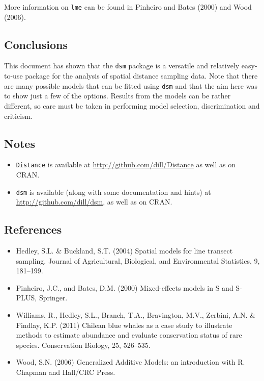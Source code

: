 \documentclass[]{article}
\begin{document}
More information on \texttt{lme} can be found in Pinheiro and Bates
(2000) and Wood (2006).

\subsection{Conclusions}\label{conclusions}

This document has shown that the \texttt{dsm} package is a versatile and
relatively easy-to-use package for the analysis of spatial distance
sampling data. Note that there are many possible models that can be
fitted using \texttt{dsm} and that the aim here was to show just a few
of the options. Results from the models can be rather different, so care
must be taken in performing model selection, discrimination and
criticism.

\subsection{Notes}\label{notes}

\begin{itemize}[<+->]
\itemsep1pt\parskip0pt
\item
  \texttt{Distance} is available at
  \url{http://github.com/dill/Distance} as well as on CRAN.
\item
  \texttt{dsm} is available (along with some documentation and hints) at
  \url{http://github.com/dill/dsm}, as well as on CRAN.
\end{itemize}

\subsection{References}\label{references}

\begin{itemize}[<+->]
\itemsep1pt\parskip0pt
\item
  Hedley, S.L. \& Buckland, S.T. (2004) Spatial models for line transect
  sampling. Journal of Agricultural, Biological, and Environmental
  Statistics, 9, 181--199.
\item
  Pinheiro, J.C., and Bates, D.M. (2000) Mixed-effects models in S and
  S-PLUS, Springer.
\item
  Williams, R., Hedley, S.L., Branch, T.A., Bravington, M.V., Zerbini,
  A.N. \& Findlay, K.P. (2011) Chilean blue whales as a case study to
  illustrate methods to estimate abundance and evaluate conservation
  status of rare species. Conservation Biology, 25, 526--535.
\item
  Wood, S.N. (2006) Generalized Additive Models: an introduction with R.
  Chapman and Hall/CRC Press.
\end{itemize}
\end{document}
